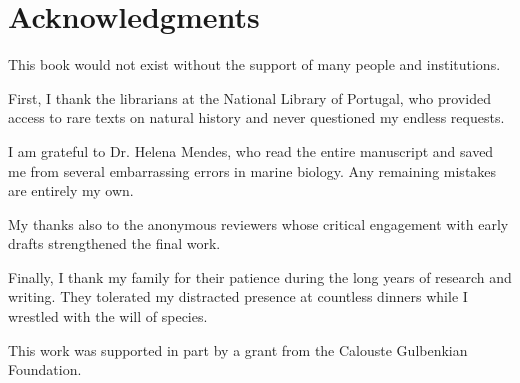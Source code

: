 \chapter{Acknowledgments}

This book would not exist without the support of many people and institutions.

First, I thank the librarians at the National Library of Portugal, who 
provided access to rare texts on natural history and never questioned my 
endless requests.

I am grateful to Dr. Helena Mendes, who read the entire manuscript and 
saved me from several embarrassing errors in marine biology. Any remaining 
mistakes are entirely my own.

My thanks also to the anonymous reviewers whose critical engagement with 
early drafts strengthened the final work.

Finally, I thank my family for their patience during the long years of 
research and writing. They tolerated my distracted presence at countless 
dinners while I wrestled with the will of species.

This work was supported in part by a grant from the Calouste Gulbenkian 
Foundation.